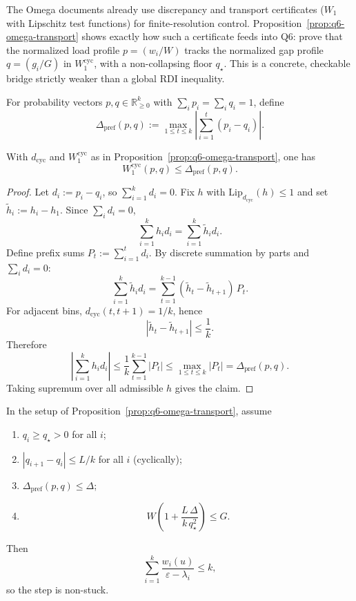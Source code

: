 \begin{remark}
The Omega documents already use discrepancy and transport certificates
($W_1$ with Lipschitz test functions) for finite-resolution control.
Proposition~\ref{prop:q6-omega-transport} shows exactly how such a
certificate feeds into Q6: prove that the normalized load profile
$p=(w_i/W)$ tracks the normalized gap profile $q=(g_i/G)$ in
$W_1^{\mathrm{cyc}}$, with a non-collapsing floor $q_\star$.
This is a concrete, checkable bridge strictly weaker than a global RDI
inequality.
\end{remark}

\begin{definition}\label{def:q6-cyc-prefix}
For probability vectors $p,q\in\mathbb R_{\ge 0}^k$ with
$\sum_i p_i=\sum_i q_i=1$, define
\[
\Delta_{\mathrm{pref}}(p,q):=
\max_{1\le t\le k}\left|\sum_{i=1}^t (p_i-q_i)\right|.
\]
\end{definition}

\begin{lemma}\label{lem:q6-cyc-prefix-w1}
With $d_{\mathrm{cyc}}$ and $W_1^{\mathrm{cyc}}$ as in
Proposition~\ref{prop:q6-omega-transport}, one has
\[
W_1^{\mathrm{cyc}}(p,q)\le \Delta_{\mathrm{pref}}(p,q).
\]
\end{lemma}

\begin{proof}
Let $d_i:=p_i-q_i$, so $\sum_{i=1}^k d_i=0$.
Fix $h$ with $\mathrm{Lip}_{d_{\mathrm{cyc}}}(h)\le 1$ and set
$\tilde h_i:=h_i-h_1$. Since $\sum_i d_i=0$,
\[
\sum_{i=1}^k h_i d_i=\sum_{i=1}^k \tilde h_i d_i.
\]
Define prefix sums $P_t:=\sum_{i=1}^t d_i$.
By discrete summation by parts and $\sum_i d_i=0$:
\[
\sum_{i=1}^k \tilde h_i d_i
=
\sum_{t=1}^{k-1}(\tilde h_t-\tilde h_{t+1})\,P_t.
\]
For adjacent bins, $d_{\mathrm{cyc}}(t,t+1)=1/k$, hence
\[
|\tilde h_t-\tilde h_{t+1}|\le \frac{1}{k}.
\]
Therefore
\[
\left|\sum_{i=1}^k h_i d_i\right|
\le
\frac1k\sum_{t=1}^{k-1}|P_t|
\le
\max_{1\le t\le k}|P_t|
=
\Delta_{\mathrm{pref}}(p,q).
\]
Taking supremum over all admissible $h$ gives the claim.
\end{proof}

\begin{corollary}\label{cor:q6-omega-discrepancy}
In the setup of Proposition~\ref{prop:q6-omega-transport}, assume
\begin{enumerate}[nosep]
\item $q_i\ge q_\star>0$ for all $i$;
\item $|q_{i+1}-q_i|\le L/k$ for all $i$ (cyclically);
\item $\Delta_{\mathrm{pref}}(p,q)\le \Delta$;
\item
\[
W\left(1+\frac{L\,\Delta}{k\,q_\star^2}\right)\le G.
\]
\end{enumerate}
Then
\[
\sum_{i=1}^k\frac{w_i(u)}{\varepsilon-\lambda_i}\le k,
\]
so the step is non-stuck.
\end{corollary}

